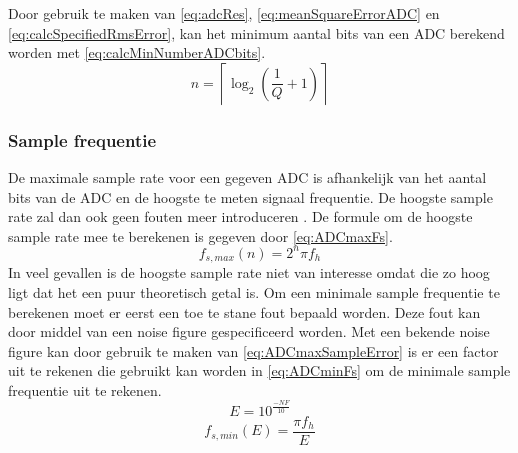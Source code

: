 Door gebruik te maken van \autoref{eq:adcRes}, \autoref{eq:meanSquareErrorADC} en \autoref{eq:calcSpecifiedRmsError}, kan het minimum aantal bits van een ADC berekend worden met \autoref{eq:calcMinNumberADCbits}.
\begin{equation}\label{eq:calcMinNumberADCbits}
    n=\left\lceil\log_2\left(\frac{1}{Q}+1\right)\right\rceil
\end{equation}

\subsubsection{Sample frequentie}\label{sec:ADC:sampleFreq}
De maximale sample rate voor een gegeven ADC is afhankelijk van het aantal bits van de ADC en de hoogste te meten signaal frequentie. De hoogste sample rate zal dan ook geen fouten meer introduceren \cite{MJHcalcADC}. De formule om de hoogste sample rate mee te berekenen is gegeven door \autoref{eq:ADCmaxFs}.
\begin{equation}\label{eq:ADCmaxFs}
    f_{s,max}\left(n\right)=2^n\pi f_h
\end{equation}
In veel gevallen is de hoogste sample rate niet van interesse omdat die zo hoog ligt dat het een puur theoretisch getal is. Om een minimale sample frequentie te berekenen moet er eerst een toe te stane fout bepaald worden. Deze fout kan door middel van een noise figure gespecificeerd worden. Met een bekende noise figure kan door gebruik te maken van \autoref{eq:ADCmaxSampleError} is er een factor uit te rekenen die gebruikt kan worden in \autoref{eq:ADCminFs} om de minimale sample frequentie uit te rekenen.
\begin{equation}\label{eq:ADCmaxSampleError}
    E=10^{\frac{-NF}{10}}
\end{equation}
\begin{equation}\label{eq:ADCminFs}
    f_{s,min}\left(E\right)=\frac{\pi f_h}{E}
\end{equation}


